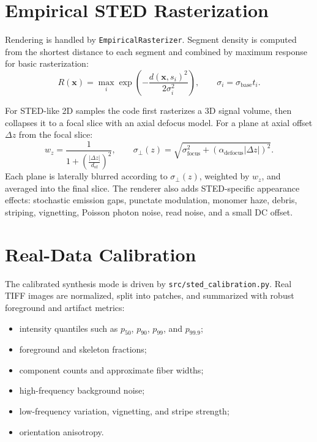\documentclass[11pt, a4paper]{article}
\begin{document}
\section{Empirical STED Rasterization}

Rendering is handled by \texttt{EmpiricalRasterizer}. Segment density is computed
from the shortest distance to each segment and combined by maximum response for
basic rasterization:
\begin{equation}
    R(\bm{x}) =
    \max_i \exp\left(
        -\frac{d(\bm{x}, s_i)^2}{2\sigma_i^2}
    \right),
    \qquad
    \sigma_i = \sigma_{\text{base}} t_i.
\end{equation}

For STED-like 2D samples the code first rasterizes a 3D signal volume, then
collapses it to a focal slice with an axial defocus model. For a plane at axial
offset $\Delta z$ from the focal slice:
\begin{equation}
    w_z = \frac{1}{1 + \left(\frac{|\Delta z|}{d_{\text{of}}}\right)^2},
    \qquad
    \sigma_{\perp}(z) =
    \sqrt{\sigma_{\text{focus}}^2 +
    \left(\alpha_{\text{defocus}}|\Delta z|\right)^2}.
\end{equation}
Each plane is laterally blurred according to $\sigma_{\perp}(z)$, weighted by
$w_z$, and averaged into the final slice. The renderer also adds STED-specific
appearance effects: stochastic emission gaps, punctate modulation, monomer haze,
debris, striping, vignetting, Poisson photon noise, read noise, and a small DC
offset.

\section{Real-Data Calibration}

The calibrated synthesis mode is driven by \texttt{src/sted\_calibration.py}.
Real TIFF images are normalized, split into patches, and summarized with robust
foreground and artifact metrics:
\begin{itemize}
    \item intensity quantiles such as $p_{50}$, $p_{90}$, $p_{99}$, and $p_{99.9}$;
    \item foreground and skeleton fractions;
    \item component counts and approximate fiber widths;
    \item high-frequency background noise;
    \item low-frequency variation, vignetting, and stripe strength;
    \item orientation anisotropy.
\end{itemize}
\end{document}
